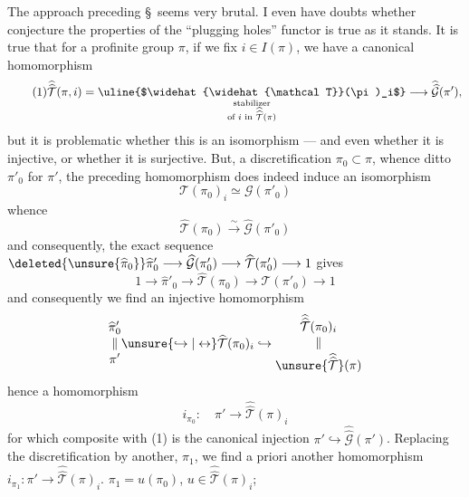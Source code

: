 The approach  preceding \S\ seems  very brutal. I even have doubts whether   conjecture  the properties of the ``plugging holes'' functor is true as it stands. It is true that for a profinite group    $\pi$, if we fix $i\in I(\pi)$, we have a canonical homomorphism
\[
\tag{1}
\widehat{\widehat{\mathcal T}}(\pi,i)
=\underset{\substack{\text{stabilizer}\\\text{of }i\text{ in }\widehat{\widehat{\mathcal T}}(\pi)}}{\text{\uline{$\widehat{\widehat{\mathcal T}}(\pi)_i$}}}
\longrightarrow \widehat{\widehat{\mathcal G}}(\pi'),
\]
but it is problematic whether this is an isomorphism --- and even whether it is injective, or whether it is surjective. But,  a discretification $\pi_0\subset\pi$, whence ditto $\pi'_0$ for $\pi'$, the preceding homomorphism does indeed induce an isomorphism
\[
\tag{1}
\mathcal T(\pi_0)_i\simeq\mathcal G(\pi'_0)
\]
whence
\[
\tag{3}
\widehat{\mathcal T}(\pi_0)\xrightarrow{\sim}\widehat{\mathcal G}(\pi'_0)
\]
and consequently, the exact sequence $\deleted{\unsure{\widehat{\pi}_0}}\widehat{\pi}'_0\longrightarrow\widehat{\mathcal G}(\pi'_0)\longrightarrow\widehat{\mathcal T}(\pi'_0)\longrightarrow 1$ gives
\[
\tag{4}
1\longrightarrow\widehat{\pi}'_0\longrightarrow\widehat{\mathcal T}(\pi_0)\longrightarrow\widehat{\mathcal T}(\pi'_0)\longrightarrow 1
\]
and consequently we find an injective homomorphism
\[
\begin{gathered}\widehat{\pi}'_0\\[-0.5ex]\Vert\\[-0.5ex]\pi'\end{gathered}
\unsure{\hookrightarrow|\leftrightarrow}
\widehat{\mathcal T}(\pi_0)_i
\hookrightarrow
\begin{gathered}\widehat{\widehat{\mathcal T}}(\pi_0)_i\\[-0.5ex]\Vert\\[-0.5ex]\unsure{\widehat{\widehat{\mathcal T}}}(\pi)\end{gathered}
\]
hence a homomorphism
\[
\tag{5}
i_{\pi_0}:\quad\pi'\longrightarrow\widehat{\widehat{\mathcal T}}(\pi)_i
\]
for which  composite with (1) is the canonical injection $\pi'\hookrightarrow\widehat{\widehat{\mathcal G}}(\pi')$. Replacing the discretification  by another, $\pi_1$, we find a priori another homomorphism $i_{\pi_1}:\pi'\longrightarrow\widehat{\widehat{\mathcal T}}(\pi)_i$.  $\pi_1=u(\pi_0)$, $u\in\widehat{\widehat{\mathcal T}}(\pi)_i$;

